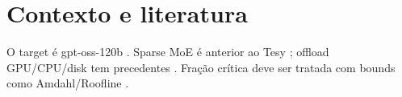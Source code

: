 \section{Contexto e literatura}
O target é gpt-oss-120b \cite{openai2025gptoss}. Sparse MoE é anterior ao Tesy \cite{shazeer2017moe}; offload GPU/CPU/disk tem precedentes \cite{sheng2023flexgen,xue2024moeinfinity}. Fração crítica deve ser tratada com bounds como Amdahl/Roofline \cite{amdahl1967validity,williams2009roofline}.
